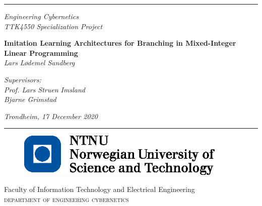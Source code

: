 \pagestyle{empty}
\newcommand{\HRule}{\rule{\linewidth}{1mm}}
 
\vspace*{-3.5cm}
\noindent\HRule
\begin{center}
 
\end{center}
\begin{center}
  \huge
	\large
	\noindent\emph{Engineering Cybernetics\\TTK4550 Specialization Project}
\end{center}
\begin{center}
 
\end{center}
\begin{center}
	\huge
	\noindent\emph{}
  \huge
  \Large
  \noindent \textbf{Imitation Learning Architectures for Branching in Mixed-Integer Linear Programming}
  \\ [7mm]
  \large
  \noindent\emph{Lars Lødemel Sandberg}
\end{center}
\begin{center}
  \huge
  \large
  \noindent\emph{Supervisors:\\ Prof. Lars Struen Imsland \\ Bjarne Grimstad}
\end{center}
\begin{center}
	\large
	\noindent \emph{Trondheim, 17 December 2020}
\end{center}
\noindent\HRule
{}
\begin{figure}[h]
	\begin{center}
		\includegraphics[angle=0, width=10cm]{img/logo_ntnu}
	\end{center}
	\label{fig:logo}
\end{figure}
 
\begin{minipage}[c]{\textwidth}
	{\setlength{\baselineskip}{0.5\baselineskip}
	\small \noindent Faculty of Information Technology and Electrical Engineering\\
	\Large \noindent \textsc{department of engineering cybernetics}}
\end{minipage}
